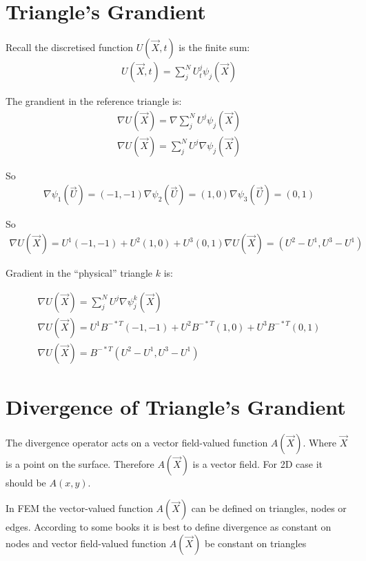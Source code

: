 \documentclass{birkjour}
\numberwithin{equation}{section}
\begin{document}
\section{Triangle's Grandient}

Recall the discretised function $U(\vec X, t)$ is the finite sum:
\begin{eqnarray}
	U(\vec X, t) = \sum_j^N{ U_t^j \psi_j(\vec X) } \nonumber
\end{eqnarray}

The grandient in the reference triangle is:
\begin{eqnarray}
	\nabla U(\vec X) = \nabla \sum_j^N{ U^j \psi_j(\vec X) } \nonumber\\
	\nabla U(\vec X) = \sum_j^N{ U^j \nabla \psi_j(\vec X) } \nonumber
\end{eqnarray}

So
\begin{eqnarray}
	\nabla \psi_1(\vec U) = (-1, -1)
	\nabla \psi_2(\vec U) = (1, 0)
	\nabla \psi_3(\vec U) = (0, 1)
\end{eqnarray}

So
\begin{eqnarray}
	\nabla U(\vec X) = U^1 (-1, -1) + U^2 (1, 0) + U^3 (0, 1)
	\nabla U(\vec X) = (U^2 - U^1, U^3 - U^1)
\end{eqnarray}

Gradient in the ``physical'' triangle $k$ is:
 
\begin{eqnarray}
	\nabla U(\vec X) = \sum_j^N{ U^j \nabla \psi^k_j(\vec X) } \nonumber\\
	\nabla U(\vec X) = U^1 B^{-*T} (-1, -1) + U^2 B^{-*T} (1, 0) + U^3 B^{-*T} (0, 1) \nonumber\\
	\nabla U(\vec X) = B^{-*T} (U^2 - U^1, U^3 - U^1) \nonumber
\end{eqnarray}

\section{Divergence of Triangle's Grandient}


The divergence operator acts on a vector field-valued function $A(\vec X)$. Where $\vec X$ is a point on the surface.
Therefore $A(\vec X)$ is a vector field. For 2D case it should be $A(x,y)$.

In FEM the vector-valued function $A(\vec X)$ can be defined on triangles, nodes or edges.
According to some books it is best to define divergence as constant on nodes and 
vector field-valued function $A(\vec X)$ be constant on triangles
\end{document}
